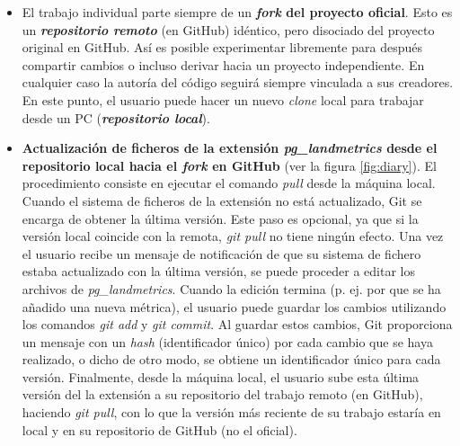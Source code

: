 \begin{itemize}
\item El trabajo individual parte siempre de un \textbf{\textit{fork} del proyecto oficial}. Esto es un \textbf{\textit{repositorio remoto}} (en GitHub) idéntico, pero disociado del proyecto original en GitHub. Así es posible experimentar libremente para después compartir cambios o incluso derivar hacia un proyecto independiente. En cualquier caso la autoría del código seguirá siempre vinculada a sus creadores. En este punto, el usuario puede hacer un nuevo \textit{clone} local para trabajar desde un PC (\textbf{\textit{repositorio local}}).

\item \textbf{Actualización de ficheros de la extensión \textit{pg\_landmetrics} desde el repositorio local hacia el \textit{fork} en GitHub} (ver la figura \ref{fig:diary}). El procedimiento consiste en ejecutar el comando \textit{pull} desde la máquina local. Cuando el sistema de ficheros de la extensión no está actualizado, Git se encarga de obtener la última versión. Este paso es opcional, ya que si la versión local coincide con la remota, \textit{git pull} no tiene ningún efecto. Una vez el usuario recibe un mensaje de notificación de que su sistema de fichero estaba actualizado con la última versión, se puede proceder a editar los archivos de \textit{pg\_landmetrics}. Cuando la edición termina (p. ej. por que se ha añadido una nueva métrica), el usuario puede guardar los cambios utilizando los comandos \textit{git add} y \textit{git commit}. Al guardar estos cambios, Git proporciona un mensaje con un \textit{hash} (identificador único) por cada cambio que se haya realizado, o dicho de otro modo, se obtiene un identificador único para cada versión. Finalmente, desde la máquina local, el usuario sube esta última versión del la extensión a su repositorio del trabajo remoto (en GitHub), haciendo \textit{git pull}, con lo que la versión más reciente de su trabajo estaría en local y en su repositorio de GitHub (no el oficial).


\end{itemize}
